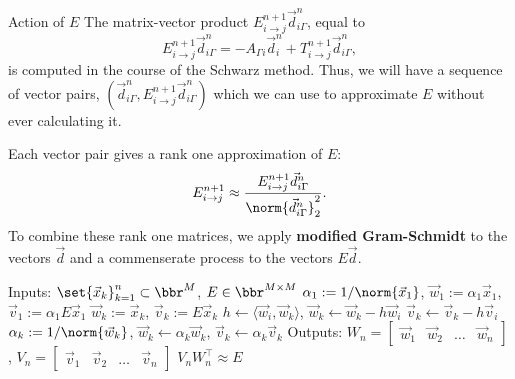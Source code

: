 \documentclass{beamer}
\DeclareMathOperator{\iaa}{IAA} %
\begin{document}
\begin{frame}{Action of $E$}
The matrix-vector product $E_{i \to j}^{n+1} \vec{d}_{i \Gamma}^n$, equal to
\begin{equation*}
	E_{i \to j}^{n+1} \vec{d}_{i \Gamma}^n = -A_{\Gamma i} \vec{d}_i^n + T_{i \to j}^{n+1} \vec{d}_{i \Gamma}^n,
\end{equation*}
is computed in the course of the Schwarz method.
Thus, we will have a sequence of vector pairs, $\left ( \vec{d}_{i \Gamma}^n, E_{i \to j}^{n+1} \vec{d}_{i \Gamma}^n \right )$ which we can use to approximate $E$ without ever calculating it.

Each vector pair gives a rank one approximation of $E$:
\begin{equation*}
	E_{i \to j}^{n+1} \approx \frac{E_{i \to j}^{n+1} \vec{d}_{i \Gamma}^n}{\norm{\vec{d}_{i \Gamma}^n}_2^2}.
\end{equation*}
To combine these rank one matrices, we apply \textbf{modified Gram-Schmidt} to the vectors $\vec{d}$ and a commenserate process to the vectors $E \vec{d}$.
\end{frame}

\begin{frame}
\begin{algorithm}[H]
	\caption{Iterative action approximation \\ $[V_n,W_n]=\iaa \left ( \set{\vec{x}_k}_{k=1}^n, E \right )$}
	\begin{algorithmic}[1]
		\State Inputs: $\set{\vec{x}_k}_{k=1}^{n} \subset \bbr^M$, $E \in \bbr^{M \times M}$
		\State $\alpha_1 := 1 / \norm{\vec{x}_1}$, $\vec{w}_1 := \alpha_1 \vec{x}_1$, $\vec{v}_1 := \alpha_1 E \vec{x}_1$
			\State $\vec{w}_k := \vec{x}_k$, $\vec{v}_k := E \vec{x}_k$
				\State $h \gets \langle \vec{w}_i, \vec{w}_k \rangle$, $\vec{w}_k \gets \vec{w}_k - h \vec{w}_i$
				\State $\vec{v}_k \gets \vec{v}_k - h \vec{v}_i$ \label{line: implicit}
			\EndFor
			\State $\alpha_k := 1 / \norm{\vec{w}_k}$, $\vec{w}_k \gets \alpha_k \vec{w}_k$, $\vec{v}_k \gets \alpha_k \vec{v}_k$
		\EndFor
		\State Outputs: $W_{n} = \begin{bmatrix} \vec{w}_1 & \vec{w}_2 & \dots & \vec{w}_{n} \end{bmatrix}$, $V_{n} = \begin{bmatrix} \vec{v}_1 & \vec{v}_2 & \dots & \vec{v}_{n} \end{bmatrix}$
		\State $V_{n} W_{n}^\top \approx E$
	\end{algorithmic}
	\label{alg: IAA}
\end{algorithm}
\end{frame}
\end{document}
